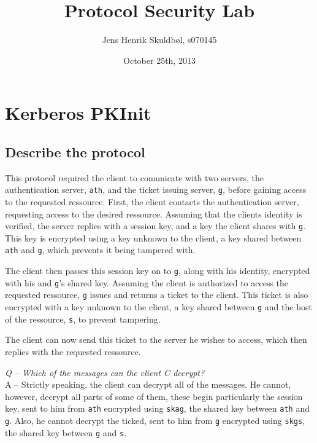 \documentclass{article}
\title{Protocol Security Lab}
\author{Jens Henrik Skuldbøl, s070145}
\date{October 25th, 2013}
\newcommand\Q[1]{
	\leavevmode\par
	\noindent
	\emph{Q -- #1}
	\\
}
\newcommand\A[1]{
	A -- #1
}
\begin{document}
\maketitle

\section{Kerberos PKInit}

\subsection{Describe the protocol}
This protocol required the client to comunicate with two servers,
the authentication server, \texttt{ath}, and the ticket issuing server, 
\texttt{g}, before gaining access to the requested ressource.
First, the client contacts the authentication server, requesting access
to the desired ressource.
Assuming that the clients identity is verified, the server replies
with a session key, and a key the client shares with \texttt{g}.
This key is encrypted using a key unknown to the client,
a key shared between \texttt{ath} and \texttt{g},
which prevents it being tampered with.

The client then passes this session key on to \texttt{g},
along with his identity, encrypted with his and \texttt{g}'s shared key.
Assuming the client is authorized to access the requested ressource,
\texttt{g} issues and returns a ticket to the client.
This ticket is also encrypted with a key unknown to the client,
a key shared between \texttt{g} and the host of the ressource, \texttt{s},
to prevent tampering.

The client can now send this ticket to the server he wishes to access,
which then replies with the requested ressource.

\Q{Which of the messages can the client \emph{C} decrypt?}
\A{
	Strictly speaking, the client can decrypt all of the messages.
	He cannot, however, decrypt all parts of some of them, these begin
	particularly the session key, sent to him from \texttt{ath} encrypted
	using \texttt{skag}, the shared key between \texttt{ath} and \texttt{g}.
	Also, he cannot decrypt the ticked, sent to him from \texttt{g} encrypted
	using \texttt{skgs}, the shared key between \texttt{g} and \texttt{s}.
}
\end{document}
